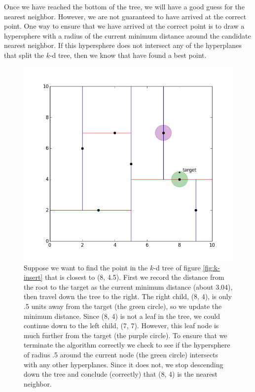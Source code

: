Once we have reached the bottom of the tree, we will have a good guess for the nearest neighbor.
However, we are not guaranteed to have arrived at the correct point.
One way to ensure that we have arrived at the correct point is to draw a hypersphere with a radius of the current minimum distance around the candidate nearest neighbor.
If this hypersphere does not intersect any of the hyperplanes that split the $k$-d tree, then we know that have found a best point.

\begin{figure}[H]
\includegraphics[width=\textwidth]{kdpic3.png}
\caption{Suppose we want to find the point in the $k$-d tree of figure \ref{fig:k-insert} that is closest to (8, 4.5). First we record the distance from the root to the target as the current minimum distance (about 3.04), then travel down the tree to the right. The right child, (8, 4), is only .5 units away from the target (the green circle), so we update the minimum distance. Since (8, 4) is not a leaf in the tree, we could continue down to the left child, (7, 7). However, this leaf node is much further from the target (the purple circle). To ensure that we terminate the algorithm correctly we check to see if the hypersphere of radius .5 around the current node (the green circle) intersects with any other hyperplanes. Since it does not, we stop descending down the tree and conclude (correctly) that (8, 4) is the nearest neighbor.}
\label{fig:bad-search}
\end{figure}

